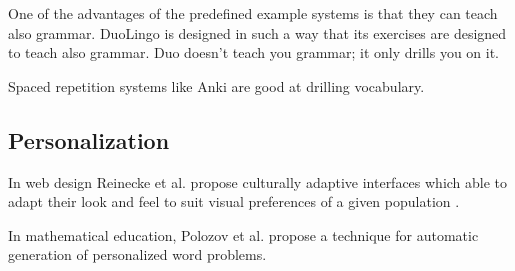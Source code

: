 One of the advantages of the predefined example systems is that they can teach also grammar. DuoLingo is designed in such a way that its exercises are designed to teach also grammar. Duo doesn't teach you grammar; it only drills you on it. 

Spaced repetition systems like Anki are good at drilling vocabulary.

\subsection{Personalization}

In web design Reinecke et al. propose culturally adaptive interfaces which able to adapt their look and feel to suit visual preferences of a given population \cite{Reinecke13-CulturalAdaptation}. 

In mathematical education, Polozov et al. propose a technique for automatic generation of personalized word problems\cite{Polozov15-AdaptableMath}.









